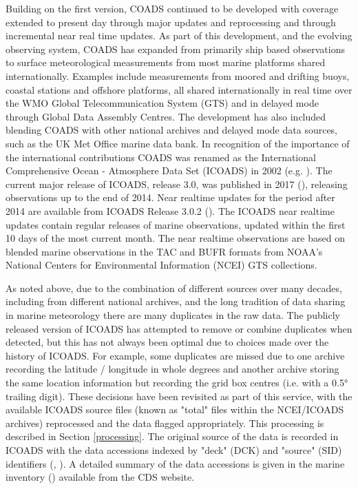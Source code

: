 Building on the first version, COADS continued to be developed with coverage extended to present day through major updates and reprocessing and through incremental near real time updates. 
As part of this development, and the evolving observing system, COADS has expanded from primarily ship based observations to surface meteorological measurements from most marine platforms shared internationally.
Examples include measurements from moored and drifting buoys, coastal stations and offshore platforms, all shared internationally in real time over the WMO Global Telecommunication System (GTS) and in delayed mode through Global Data Assembly Centres.
The development has also included blending COADS with other national archives and delayed mode data sources, such as the UK Met Office marine data bank.
In recognition of the importance of the international contributions COADS was renamed as the International Comprehensive Ocean - Atmosphere Data Set (ICOADS) in 2002 (e.g. \cite{Worley2005}). 
The current major release of ICOADS, release 3.0, was published in 2017 (\cite{Freeman2017}), releasing observations up to the end of 2014.
Near realtime updates for the period after 2014 are available from ICOADS Release 3.0.2 (\cite{Liu2022}).
The ICOADS near realtime updates contain regular releases of marine observations, updated within the first 10 days of the most current month. The near realtime observations are based on blended marine observations in the TAC and BUFR formats from NOAA's National Centers for Environmental Information (NCEI) GTS collections. 

As noted above, due to the combination of different sources over many decades, including from different national archives, and the long tradition of data sharing in marine meteorology there are many duplicates in the raw data. 
The publicly released version of ICOADS has attempted to remove or combine duplicates when detected, but this has not always been optimal due to choices made over the history of ICOADS. 
For example, some duplicates are missed due to one archive recording the latitude / longitude in whole degrees and another archive storing the same location information but recording the grid box centres (i.e. with a 0.5° trailing digit). 
These decisions have been revisited as part of this service, with the available ICOADS source files (known as "total" files within the NCEI/ICOADS archives) reprocessed and the data flagged appropriately.
This processing is described in Section \ref{processing}.
The original source of the data is recorded in ICOADS with the data accessions indexed by "deck" (DCK) and "source" (SID) identifiers (\cite{Woodruff1987}, \cite{Freeman2017}). 
A detailed summary of the data accessions is given in the marine inventory (\inventoryref{}) available from the CDS website.

